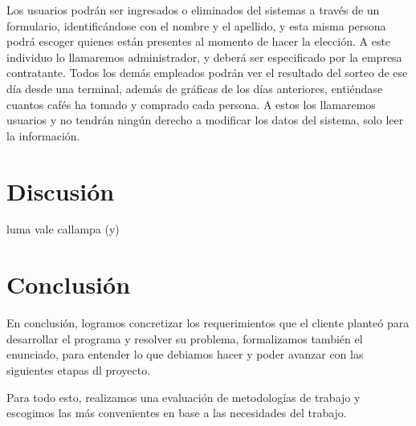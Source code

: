 \documentclass[twocolumn,11pts]{IEEEtran}
\begin{document}
Los usuarios podrán ser ingresados o eliminados del sistemas a través de un formulario, identificándose con el nombre y el apellido, y esta misma persona podrá escoger quienes están presentes al momento de hacer la elección. A este individuo lo llamaremos administrador, y deberá ser especificado por la empresa contratante. Todos los demás empleados podrán ver el resultado del sorteo de ese día desde una terminal, además de gráficas de los días anteriores, entiéndase cuantos cafés ha tomado y comprado cada persona. A estos los llamaremos usuarios y no tendrán ningún derecho a modificar los datos del sistema, solo leer la información.

\section{Discusión}
luma vale callampa (y)
\section{Conclusión}
En conclusión, logramos concretizar los requerimientos que el cliente planteó para desarrollar el programa y resolver su problema, formalizamos también el enunciado, para entender lo que debiamos hacer y poder avanzar con las siguientes etapas dl proyecto.

Para todo esto, realizamos una evaluación de metodologías de trabajo y escogimos las más convenientes en base a las necesidades del trabajo.



%
%

\end{document}
